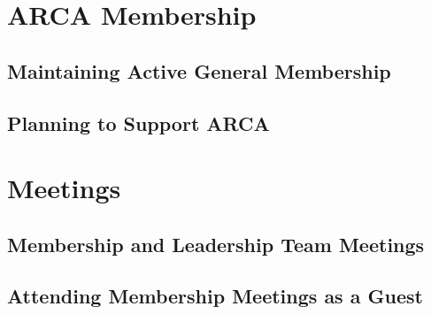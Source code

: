 \documentclass[pdflatex,letterpaper,twoside,12pt]{book}
\begin{document}
\chapter{ARCA Membership}

\section{Maintaining Active General Membership}


\section{Planning to Support ARCA}


\chapter{Meetings}

\section{Membership and Leadership Team Meetings}


\section{Attending Membership Meetings as a Guest}



\end{document}
